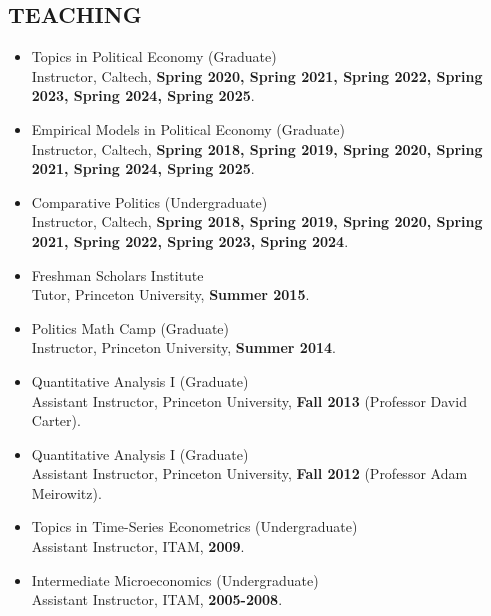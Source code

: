 \documentclass[margin, 10pt]{res} %
\begin{document}
\begin{resume}
\section{TEACHING}
\begin{itemize} \itemsep -2pt
   \item[-] Topics in Political Economy (Graduate)\\
 Instructor, Caltech, \textbf{Spring 2020, Spring 2021, Spring 2022,
   Spring 2023, Spring 2024, Spring 2025}.\\
  \item[-] Empirical Models in Political Economy (Graduate)\\
 Instructor, Caltech, \textbf{Spring 2018, Spring 2019, Spring 2020,
   Spring 2021, Spring 2024, Spring 2025}.\\
\item[-] Comparative Politics (Undergraduate)\\
  Instructor, Caltech, \textbf{Spring 2018, Spring 2019, Spring 2020,
    Spring 2021, Spring 2022, Spring 2023, Spring 2024}.\\
  \item[-] Freshman Scholars Institute\\
  Tutor, Princeton University, \textbf{Summer 2015}.\\
\item[-] Politics Math Camp (Graduate)\\
  Instructor, Princeton University, \textbf{Summer 2014}.\\
\item[-] Quantitative Analysis I (Graduate)\\
Assistant Instructor, Princeton University, \textbf{Fall 2013} (Professor
David Carter).\\
\item[-] Quantitative Analysis I (Graduate)\\
Assistant Instructor, Princeton University, \textbf{Fall 2012} (Professor
Adam Meirowitz).\\
\item[-] Topics in Time-Series Econometrics (Undergraduate)\\
Assistant Instructor, ITAM, \textbf{2009}.\\
\item[-] Intermediate Microeconomics (Undergraduate)\\
Assistant Instructor, ITAM, \textbf{2005-2008}.\\
\end{itemize}


\end{resume}
\end{document}
